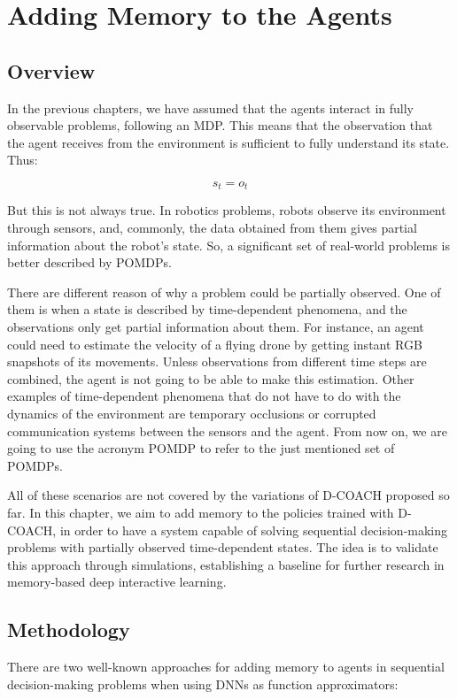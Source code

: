 \chapter{Adding Memory to the Agents}
\section{Overview}
In the previous chapters, we have assumed that the agents interact in fully observable problems, following an MDP. This means that the observation that the agent receives from the environment is sufficient to fully understand its state. Thus:

\begin{equation}
    s_{t} = o_{t}
\end{equation}

But this is not always true. In robotics problems, robots observe its environment through sensors, and, commonly, the data obtained from them gives partial information about the robot's state. So, a significant set of real-world problems is better described by POMDPs.

There are different reason of why a problem could be partially observed. One of them is when a state is described by time-dependent phenomena, and the observations only get partial information about them. For instance, an agent could need to estimate the velocity of a flying drone by getting instant RGB snapshots of its movements. Unless observations from different time steps are combined, the agent is not going to be able to make this estimation. Other examples of time-dependent phenomena that do not have to do with the dynamics of the environment are temporary occlusions or corrupted communication systems between the sensors and the agent. From now on, we are going to use the acronym POMDP to refer to the just mentioned set of POMDPs.

All of these scenarios are not covered by the variations of D-COACH proposed so far. In this chapter, we aim to add memory to the policies trained with D-COACH, in order to have a system capable of solving sequential decision-making problems with partially observed time-dependent states. The idea is to validate this approach through simulations, establishing a baseline for further research in memory-based deep interactive learning.
\newpage

\section{Methodology}
There are two well-known approaches for adding memory to agents in sequential decision-making problems when using DNNs as function approximators:

